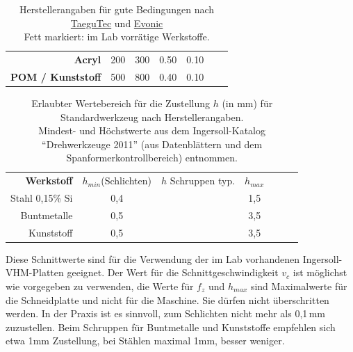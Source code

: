 \documentclass{\basedir/fablab-document}
\begin{document}
\begin{table}
\begin{tabular}{rcccccc}
	\textbf{Acryl}				   & 200	& 300 	& 0.50 	& 0.10\\
	\textbf{POM / Kunststoff}			   & 500	& 800 	& 0.40 	& 0.10\\
\end{tabular}
\caption{Herstellerangaben für gute Bedingungen nach \href{http://www.taegutec.com/Ustyles/DownloadFiles/I_Grades_en.pdf}{TaeguTec} und \href{http://www.roehmschweiz.ch/fileadmin/Roehm/PDF_Plexiglas/311-1_Bearbeiten_von_PLEXIGLAS_de.pdf}{Evonic} \\Fett markiert: im Lab vorrätige Werkstoffe.}
\end{table}

\begin{table}
\centering
\setlength{\tabcolsep}{0.5em}

\begin{tabular}{rcccccc}
  \textbf{Werkstoff} & $h_{min}$(Schlichten) & $h$ Schruppen typ. & $h_{max}$ \\
  Stahl 0,15\% Si       & 0,4 & & 1,5\\
  Buntmetalle           & 0,5 & & 3,5\\
  Kunststoff            & 0,5 & & 3,5\\
\end{tabular}
\caption{Erlaubter Wertebereich für die Zustellung $h$ (in mm) für Standardwerkzeug nach Herstellerangaben. \\Mindest- und Höchstwerte aus dem Ingersoll-Katalog \enquote{Drehwerkzeuge 2011} (aus Datenblättern und dem Spanformerkontrollbereich) entnommen.}
\end{table} 

Diese Schnittwerte sind für die Verwendung der im Lab vorhandenen Ingersoll-VHM-Platten geeignet. Der Wert für die Schnittgeschwindigkeit $v_c$ ist möglichst wie vorgegeben zu verwenden, die Werte für $f_z$ und $h_{max}$ sind Maximalwerte für die Schneidplatte und nicht für die Maschine. Sie dürfen nicht überschritten werden. In der Praxis ist es sinnvoll, zum Schlichten nicht mehr als 0,1\,mm zuzustellen. Beim Schruppen für Buntmetalle und Kunststoffe empfehlen sich etwa 1mm Zustellung, bei Stählen maximal 1mm, besser weniger.\\
\end{document}
